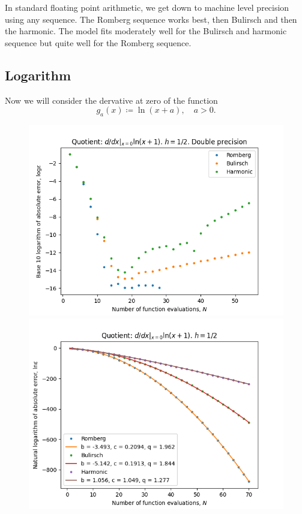 In standard floating point arithmetic, we get down to machine level precision using any sequence. The Romberg sequence works best, then Bulirsch and then the harmonic. The model fits moderately well for the Bulirsch and harmonic sequence but quite well for the Romberg sequence.

\subsection{Logarithm}

Now we will consider the dervative at zero of the function 
\[
g_a(x) \coloneqq \ln(x+a), \quad a > 0.
\]

\begin{figure}[H]
\centering
\begin{minipage}{0.45\textwidth}
\centering
\includegraphics[scale=0.45]{diff_quot_plots/h_one.png}
\end{minipage}
\begin{minipage}{0.45\textwidth}
\centering
\includegraphics[scale=0.45]{diff_quot_plots/h_one_hp_trend.png}
\end{minipage}
\end{figure}

